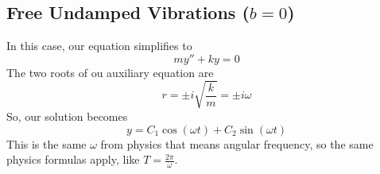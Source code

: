 \subsection{Free Undamped Vibrations ($b = 0$)}
\noindent
In this case, our equation simplifies to
\begin{equation*}
	my'' + ky = 0
\end{equation*}
The two roots of ou auxiliary equation are
\begin{equation*}
	r = \pm i \sqrt{\frac{k}{m}} = \pm i\omega
\end{equation*}
So, our solution becomes
\begin{equation*}
	y = C_1\cos{(\omega t)} + C_2\sin{(\omega t)}
\end{equation*}
This is the same $\omega$ from physics that means angular frequency, so the same physics formulas apply, like $T = \frac{2\pi}{\omega}$.\\

